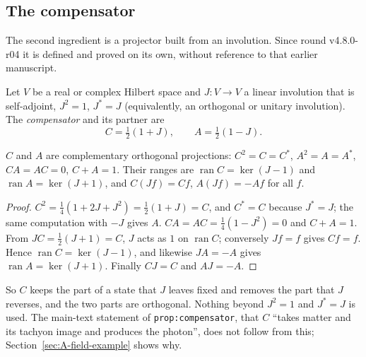 \subsection{The compensator}
\label{sec:A-compensator}

The second ingredient is a projector built from an involution. Since round v4.8.0-r04 it is defined
and proved on its own, without reference to that earlier manuscript.

\begin{definition}
\label{def:A-compensator}
Let $V$ be a real or complex Hilbert space and $J:V\to V$ a linear involution that is self-adjoint,
$J^2=1$, $J^*=J$ (equivalently, an orthogonal or unitary involution). The \emph{compensator} and its
partner are
\begin{equation}
C=\tfrac12(1+J),\qquad A=\tfrac12(1-J).
\label{eq:A-compensator}
\end{equation}
\end{definition}

\begin{proposition}
\label{prop:A-compensator}
$C$ and $A$ are complementary orthogonal projections: $C^2=C=C^*$, $A^2=A=A^*$, $CA=AC=0$, $C+A=1$.
Their ranges are $\operatorname{ran}C=\ker(J-1)$ and $\operatorname{ran}A=\ker(J+1)$, and
$C(Jf)=Cf$, $A(Jf)=-Af$ for all $f$.
\end{proposition}

\begin{proof}
$C^2=\tfrac14(1+2J+J^2)=\tfrac12(1+J)=C$, and $C^*=C$ because $J^*=J$; the same computation with $-J$
gives $A$. $CA=AC=\tfrac14(1-J^2)=0$ and $C+A=1$. From $JC=\tfrac12(J+1)=C$, $J$ acts as $1$ on
$\operatorname{ran}C$; conversely $Jf=f$ gives $Cf=f$. Hence $\operatorname{ran}C=\ker(J-1)$, and likewise
$JA=-A$ gives $\operatorname{ran}A=\ker(J+1)$. Finally $CJ=C$ and $AJ=-A$.
\end{proof}

So $C$ keeps the part of a state that $J$ leaves fixed and removes the part that $J$ reverses, and the
two parts are orthogonal. Nothing beyond $J^2=1$ and $J^*=J$ is used. The main-text statement
of \texttt{prop:compensator}, that $C$ ``takes matter and its tachyon image and produces the photon'',
does not follow from this; Section~\ref{sec:A-field-example} shows why.

